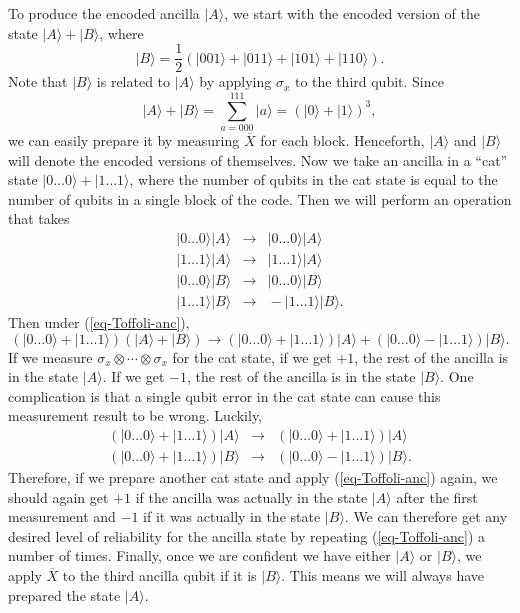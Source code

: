 \documentclass{report}
\newcommand{\ket}[1]{|{#1}\rangle}
\newcommand{\X}{\sigma_x}
\newcommand{\Xbar}{\overline{X}}
\newcommand{\Sum}{\sum}
\begin{document}
To produce the encoded ancilla $\ket{A}$, we start with the encoded 
version of the state $\ket{A} + \ket{B}$, where
\begin{equation}
\ket{B} = \frac{1}{2} (\ket{001} + \ket{011} + \ket{101} + \ket{110}).
\end{equation}
Note that $\ket{B}$ is related to $\ket{A}$ by applying $\X$ to the third 
qubit.  Since 
\begin{equation}
\ket{A} + \ket{B} = \Sum_{a=000}^{111} \ket{a} = (\ket{0} + \ket{1})^3,
\end{equation}
we can easily prepare it by measuring $\Xbar$ for each block.  
Henceforth, $\ket{A}$ and $\ket{B}$ will denote the encoded versions of 
themselves.  Now we take an ancilla in a ``cat'' state $\ket{0 \ldots 0} + 
\ket{1 \ldots 1}$, where the number of qubits in the cat state is equal to 
the number of qubits in a single block of the code.  Then we will perform 
an operation that takes
\begin{eqnarray}
\ket{0 \ldots 0} \ket{A} & \rightarrow & \ket{0 \ldots 0} \ket{A} 
\nonumber \\
\ket{1 \ldots 1} \ket{A} & \rightarrow & \ket{1 \ldots 1} \ket{A} 
\label{eq-Toffoli-anc} \\
\ket{0 \ldots 0} \ket{B} & \rightarrow & \ket{0 \ldots 0} \ket{B} 
\nonumber \\
\ket{1 \ldots 1} \ket{B} & \rightarrow & \!\!\! - \ket{1 \ldots 1} \ket{B}. 
\nonumber
\end{eqnarray}
Then under (\ref{eq-Toffoli-anc}),
\begin{equation}
(\ket{0 \ldots 0} + \ket{1 \ldots 1}) (\ket{A} + \ket{B}) \rightarrow (\ket{0 
\ldots 0} + \ket{1 \ldots 1}) \ket{A} + (\ket{0 \ldots 0} - \ket{1 \ldots 1}) 
\ket{B}.
\end{equation}
If we measure $\X \otimes \cdots \otimes \X$ for the cat state, if we get 
$+1$, the rest of the ancilla is in the state $\ket{A}$.  If we get $-1$, the 
rest of the ancilla is in the state $\ket{B}$.  One complication is that a 
single qubit error in the cat state can cause this measurement result to be 
wrong.  Luckily,
\begin{eqnarray}
(\ket{0 \ldots 0} + \ket{1 \ldots 1}) \ket{A} & \rightarrow & (\ket{0 \ldots 
0} + \ket{1 \ldots 1}) \ket{A} \\
(\ket{0 \ldots 0} + \ket{1 \ldots 1}) \ket{B} & \rightarrow & (\ket{0 \ldots 
0} - \ket{1 \ldots 1}) \ket{B}.
\end{eqnarray}
Therefore, if we prepare another cat state and apply (\ref{eq-Toffoli-anc}) 
again, we should again get $+1$ if the ancilla was actually in the state 
$\ket{A}$ after the first measurement and $-1$ if it was actually in the 
state $\ket{B}$.  We can therefore get any desired level of reliability for 
the ancilla state by repeating (\ref{eq-Toffoli-anc}) a number of times.  
Finally, once we are confident we have either $\ket{A}$ or $\ket{B}$, we 
apply $\Xbar$ to the third ancilla qubit if it is $\ket{B}$.  This 
means we will always have prepared the state $\ket{A}$.
\end{document}
